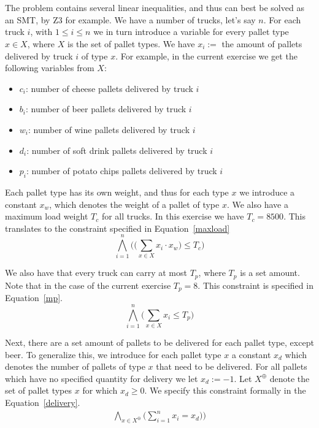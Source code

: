 \chapter{}\label{chp:1}
The problem contains several linear inequalities, and thus can best be solved as an SMT, by Z3 for example. We have a number of trucks, let's say $n$. For each truck $i$, with $1 \leq i \leq n$ we in turn introduce a variable for every pallet type $x \in X$, where $X$ is the set of pallet types. We have $x_i :=$ the amount of pallets delivered by truck $i$ of type $x$. For example, in the current exercise we get the following variables from $X$:
\begin{itemize}
    \item $c_i$: number of cheese pallets delivered by truck $i$
    \item $b_i$: number of beer pallets delivered by truck $i$
    \item $w_i$: number of wine pallets delivered by truck $i$
    \item $d_i$: number of soft drink pallets delivered by truck $i$
    \item $p_i$: number of potato chips pallets delivered by truck $i$
\end{itemize}

Each pallet type has its own weight, and thus for each type $x$ we introduce a constant $x_w$, which denotes the weight of a pallet of type $x$. We also have a maximum load weight $T_c$ for all trucks. In this exercise we have $T_c = 8500$. This translates to the constraint specified in Equation~\ref{maxload}
\begin{equation}
    \label{maxload}
    \bigwedge^{n}_{i=1}\bigg(\big(\sum_{x \in X} x_i \cdot x_w\big) \leq T_c \bigg)
\end{equation}

We also have that every truck can carry at most $T_p$, where $T_p$ is a set amount. Note that in the case of the current exercise $T_p = 8$. This constraint is specified in Equation~\ref{mp}.
\begin{equation}
    \label{mp}
    \bigwedge^{n}_{i=1}\bigg(\sum_{x \in X} x_i \leq T_p\bigg)
\end{equation}

Next, there are a set amount of pallets to be delivered for each pallet type, except beer. To generalize this, we introduce for each pallet type $x$ a constant $x_d$ which denotes the number of pallets of type $x$ that need to be delivered. For all pallets which have no specified quantity for delivery we let $x_d := -1$. Let $X^{\oplus}$ denote the set of pallet types $x$ for which $x_d \geq 0$. We specify this constraint formally in the Equation~\ref{delivery}.
\begin{equation}
    \begin{aligned}
    \label{delivery}
    \bigwedge_{x \in X^{\oplus}}\bigg(\sum^{n}_{i=1} x_i = x_d)\bigg)
    \end{aligned}
\end{equation}

